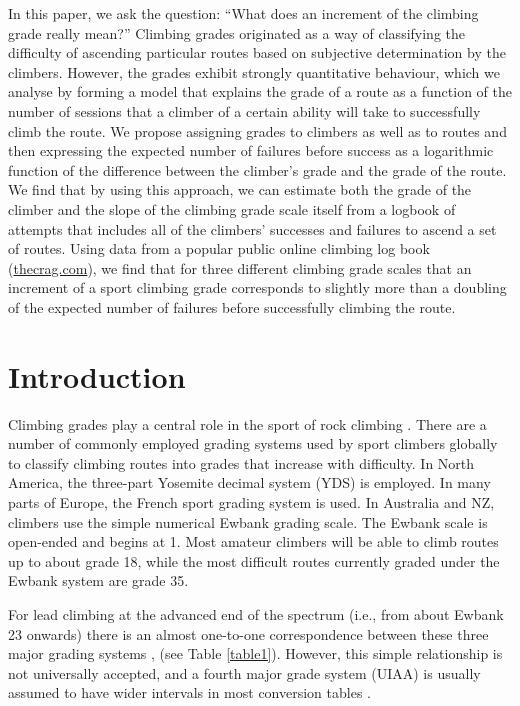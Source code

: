 \documentclass[12pt]{article}
\begin{document}
In this paper, we ask the question: ``What does an increment of the climbing grade really mean?''  Climbing grades originated as a way of classifying the difficulty of ascending particular routes based on subjective determination by the climbers.  However, the grades exhibit strongly quantitative behaviour, which we analyse by forming a model that explains the grade of a route as a function of the number of sessions that a climber of a certain ability will take to successfully climb the route. We propose assigning grades to climbers as well as to routes and then expressing the expected number of failures before success as a logarithmic function of the difference between the climber's grade and the grade of the route.  We find that by using this approach, we can estimate both the grade of the climber and the slope of the climbing grade scale itself from a logbook of attempts that includes all of the climbers' successes and failures to ascend a set of routes.  Using data from a popular public online climbing log book (\url{thecrag.com}), we find that for three different climbing grade scales that an increment of a sport climbing grade corresponds to slightly more than a doubling of the expected number of failures before successfully climbing the route.

\section{Introduction}

Climbing grades play a central role in the sport of rock climbing \citep{delignieres1993psychophysical,draper2015comparative}. There are a number of commonly employed grading systems used by sport climbers globally to classify climbing routes into grades that increase with difficulty.  In North America, the three-part Yosemite decimal system (YDS) is employed.  In many parts of Europe, the French sport grading system is used.  In Australia and NZ, climbers use the simple numerical Ewbank grading scale. The Ewbank scale is open-ended and begins at 1. Most amateur climbers will be able to climb routes up to about grade 18, while the most difficult routes currently graded under the Ewbank system are grade 35.

For lead climbing at the advanced end of the spectrum (i.e., from about Ewbank 23 onwards) there is an almost one-to-one correspondence between these three major grading systems \citep{draper2015comparative}, (see Table \ref{table1}).  However, this simple relationship is not universally accepted, and a fourth major grade system (UIAA) is usually assumed to have wider intervals in most conversion tables \citep{draper2015comparative}.
\end{document}
